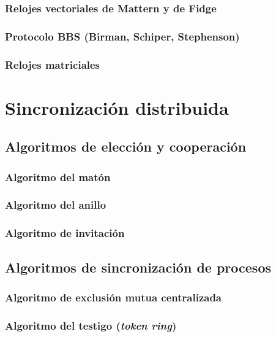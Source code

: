 \documentclass[a4paper, 11pt, titlepage]{article}
\begin{document}
        \subsubsection{Relojes vectoriales de Mattern y de Fidge}

        \subsubsection{Protocolo BBS (Birman, Schiper, Stephenson)}

        \subsubsection{Relojes matriciales}

\section{Sincronización distribuida}

    \subsection{Algoritmos de elección y cooperación}

        \subsubsection{Algoritmo del matón}

        \subsubsection{Algoritmo del anillo}

        \subsubsection{Algoritmo de invitación}

    \subsection{Algoritmos de sincronización de procesos}

        \subsubsection{Algoritmo de exclusión mutua centralizada}

        \subsubsection{Algoritmo del testigo (\textit{token ring})}
\end{document}
